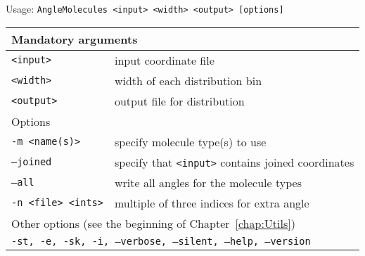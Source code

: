 \vspace{1em}
\noindent
Usage: \tt{AngleMolecules <input> <width> <output> [options]}
\noindent
\begin{longtable}{p{}p{}}
  \toprule
  \multicolumn{2}{l}{Mandatory arguments} \\
  \midrule
  \texttt{<input>}       & input coordinate file\\
  \texttt{<width>}       & width of each distribution bin\\
  \texttt{<output>}      & output file for distribution\\
  \midrule
  \multicolumn{2}{l}{Options}\\
  \midrule
  \texttt{-m <name(s)>} & specify molecule type(s) to use\\
  \texttt{--joined}     & specify that \texttt{<input>} contains joined
    coordinates\\
  \texttt{--all}        & write all angles for the molecule types\\
  \texttt{-n <file> <ints>} & multiple of three indices for extra angle\\
  \midrule
  \multicolumn{2}{l}{Other options (see the beginning of
                     Chapter~\ref{chap:Utils})}\\
  \midrule
  \multicolumn{2}{p{0.948\textwidth}}{\tt{-st},
                                      \tt{-e},
                                      \tt{-sk},
                                      \tt{-i},
                                      \tt{--verbose},
                                      \tt{--silent},
                                      \tt{--help},
                                      \tt{--version}}\\
  \bottomrule
\end{longtable}


